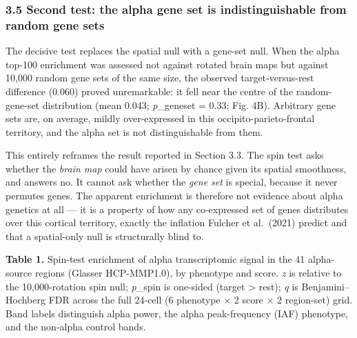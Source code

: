 \documentclass[
  11pt,
  letterpaper,
]{article}
\begin{document}
\subsubsection{3.5 Second test: the alpha gene set is indistinguishable
from random gene
sets}\label{second-test-the-alpha-gene-set-is-indistinguishable-from-random-gene-sets}

The decisive test replaces the spatial null with a gene-set null. When
the alpha top-100 enrichment was assessed not against rotated brain maps
but against 10,000 random gene sets of the same size, the observed
target-versus-rest difference (0.060) proved unremarkable: it fell near
the centre of the random-gene-set distribution (mean 0.043;
\emph{p}\_geneset = 0.33; Fig. 4B). Arbitrary gene sets are, on average,
mildly over-expressed in this occipito-parieto-frontal territory, and
the alpha set is not distinguishable from them.

This entirely reframes the result reported in Section 3.3. The spin test
asks whether the \emph{brain map} could have arisen by chance given its
spatial smoothness, and answers no. It cannot ask whether the \emph{gene
set} is special, because it never permutes genes. The apparent
enrichment is therefore not evidence about alpha genetics at all --- it
is a property of how any co-expressed set of genes distributes over this
cortical territory, exactly the inflation Fulcher et al.~(2021) predict
and that a spatial-only null is structurally blind to.

\textbf{Table 1.} Spin-test enrichment of alpha transcriptomic signal in
the 41 alpha-source regions (Glasser HCP-MMP1.0), by phenotype and
score. \emph{z} is relative to the 10,000-rotation spin null;
\emph{p}\_spin is one-sided (target \textgreater{} rest); \emph{q} is
Benjamini--Hochberg FDR across the full 24-cell (6 phenotype × 2 score ×
2 region-set) grid. Band labels distinguish alpha power, the alpha
peak-frequency (IAF) phenotype, and the non-alpha control bands.
\end{document}
